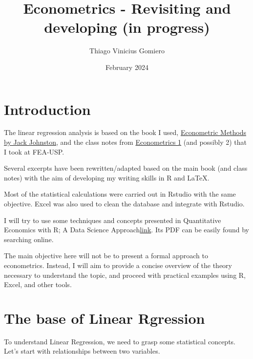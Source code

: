 \documentclass{article} %
\title{Econometrics - Revisiting and developing (in progress)} %
\author{Thiago  Vinicius Gomiero} %
\date{February 2024} %
\begin{document}


\maketitle %

\section{Introduction} %
The linear regression analysis is based on the book I used, \href{https://drive.google.com/file/d/1TIP3vEfFTzmsyAT_NdfeEucQ3Buzl79L/view?usp=sharing}{Econometric Methods by Jack Johnston}, and the class notes from \href{https://1drv.ms/o/s!AmlxSSt9Wu45_hK-coxj_ULKBVLC?e=dclINF}{Econometrics 1} (and possibly 2) that I took at FEA-USP.

Several excerpts have been rewritten/adapted based on the main book (and class notes) with the aim of developing my writing skills in R and LaTeX.

Most of the statistical calculations were carried out in Rstudio with the same objective. Excel was also used to clean the database and integrate with Rstudio.

I will try to use some techniques and concepts presented in Quantitative Economics with R; A Data Science Approach\href{https://link.springer.com/book/10.1007/978-981-15-2035-8}{link}. Its PDF can be easily found by searching online.

The main objective here will not be to present a formal approach to econometrics. Instead, I will aim to provide a concise overview of the theory necessary to understand the topic, and proceed with practical examples using R, Excel, and other tools.


\section{The base of Linear Rgression}
To understand Linear Regression, we need to grasp some statistical concepts.
Let's start with relationships between two variables.
\end{document}
